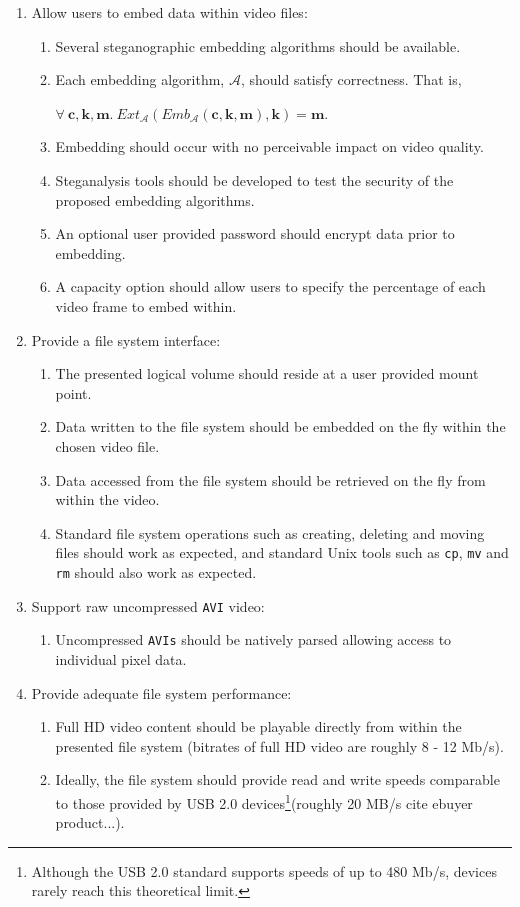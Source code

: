 \documentclass[paper=a4, fontsize=11pt,twoside]{scrartcl}    %
\numberwithin{table}{section}
\numberwithin{figure}{section}
\numberwithin{algorithm}{section}
\begin{document}
\begin{enumerate}
\item Allow users to embed data within video files:
	\begin{enumerate}
		\item Several steganographic embedding algorithms should be available.
		\item Each embedding algorithm, $\mathcal{A}$, should satisfy correctness. That is,
		\begin{center}
			$\forall ~\textbf{c}, \textbf{k}, \textbf{m}. ~Ext_{\mathcal{A}}(Emb_{\mathcal{A}}(\textbf{c}, \textbf{k}, \textbf{m}), \textbf{k}) = \textbf{m}$.
		\end{center}
		\item Embedding should occur with no perceivable impact on video quality.
		\item Steganalysis tools should be developed to test the security of the proposed embedding algorithms.
		\item An optional user provided password should encrypt data prior to embedding.
		\item A capacity option should allow users to specify the percentage of each video frame to embed within.
	\end{enumerate}
\item Provide a file system interface:
	\begin{enumerate}
		\item The presented logical volume should reside at a user provided mount point.		
		\item Data written to the file system should be embedded on the fly within the chosen video file.
		\item Data accessed from the file system should be retrieved on the fly from within the video.
		\item Standard file system operations such as creating, deleting and moving files should work as expected, and standard Unix tools such as \texttt{cp}, \texttt{mv} and \texttt{rm} should also work as expected.
	\end{enumerate}	
\item Support raw uncompressed \texttt{AVI} video:
	\begin{enumerate}
		\item Uncompressed \texttt{AVIs} should be natively parsed allowing access to individual pixel data.
	\end{enumerate}	
\item Provide adequate file system performance:
	\begin{enumerate}
		\item Full HD video content should be playable directly from within the presented file system (bitrates of full HD video are roughly 8 - 12 Mb/s).
		\item Ideally, the file system should provide read and write speeds comparable to those provided by USB 2.0 devices\footnote{Although the USB 2.0 standard supports speeds of up to 480 Mb/s, devices rarely reach this theoretical limit.}(roughly 20 MB/s cite ebuyer product...).
	\end{enumerate}		
\end{enumerate}
\end{document}
